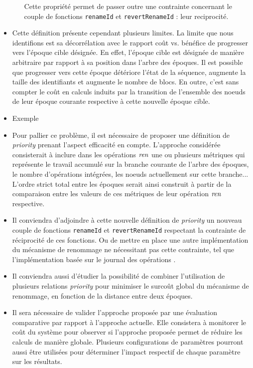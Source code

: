 \begin{itemize}
\begin{enumerate}
                Cette propriété permet de passer outre une contrainte concernant le couple de fonctions \texttt{renameId} et \texttt{revertRenameId} : leur reciprocité.
        \end{enumerate}
    \item Cette définition présente cependant plusieurs limites.
        La limite que nous identifions est sa décorrélation avec le rapport coût vs. bénéfice de progresser vers l'époque cible désignée.
        En effet, l'époque cible est désignée de manière arbitraire par rapport à sa position dans l'arbre des époques.
        Il est possible que progresser vers cette époque détériore l'état de la séquence, \ie augmente la taille des identifiants et augmente le nombre de blocs.
        En outre, c'est sans compter le coût en calculs induits par la transition de l'ensemble des noeuds de leur époque courante respective à cette nouvelle époque cible.
    \item Exemple
    \item Pour pallier ce problème, il est nécessaire de proposer une définition de \emph{priority} prenant l'aspect efficacité en compte.
        L'approche considérée consisterait à inclure dans les opérations $\mathit{ren}$ une ou plusieurs métriques qui représente le travail accumulé sur la branche courante de l'arbre des époques, \eg le nombre d'opérations intégrées, les noeuds actuellement sur cette branche...
        L'ordre strict total entre les époques serait ainsi construit à partir de la comparaison entre les valeurs de ces métriques de leur opération $\mathit{ren}$ respective.
    \item Il conviendra d'adjoindre à cette nouvelle définition de \emph{priority} un nouveau couple de fonctions \texttt{renameId} et \texttt{revertRenameId} respectant la contrainte de réciprocité de ces fonctions.
        Ou de mettre en place une autre implémentation du mécanisme de renommage ne nécessitant pas cette contrainte, tel que l'implémentation basée sur le journal des opérations .
    \item Il conviendra aussi d'étudier la possibilité de combiner l'utilisation de plusieurs relations \emph{priority} pour minimiser le surcoût global du mécanisme de renommage, \eg en fonction de la distance entre deux époques.
    \item Il sera nécessaire de valider l'approche proposée par une évaluation comparative par rapport à l'approche actuelle.
        Elle consistera à monitorer le coût du système pour observer si l'approche proposée permet de réduire les calculs de manière globale.
        Plusieurs configurations de paramètres pourront aussi être utilisées pour déterminer l'impact respectif de chaque paramètre sur les résultats.
\end{itemize}
